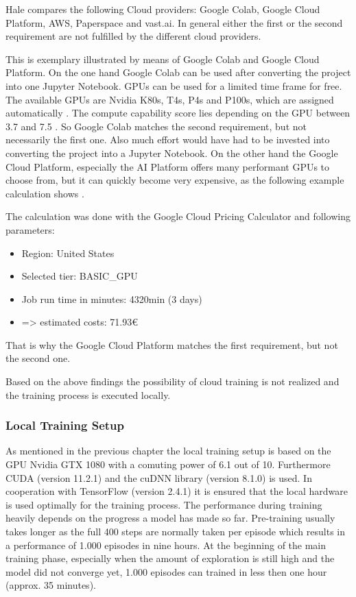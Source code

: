 Hale \cite{Hale2019} compares the following Cloud providers: Google Colab, Google Cloud Platform, AWS, Paperspace and vast.ai. In general either the first or the second requirement are not fulfilled by the different cloud providers. 

This is exemplary illustrated by means of Google Colab and Google Cloud Platform. 
On the one hand Google Colab can be used after converting the project into one Jupyter Notebook. GPUs can be used for a limited time frame for free. The available GPUs are Nvidia K80s, T4s, P4s and P100s, which are assigned automatically \cite{Colab2021}. The compute capability score lies depending on the GPU between 3.7 and 7.5 \cite{Nvidia}. So Google Colab matches the second requirement, but not necessarily the first one. Also much effort would have had to be invested into converting the project into a Jupyter Notebook. 
On the other hand the Google Cloud Platform, especially the AI Platform offers many performant GPUs to choose from, but it can quickly become very expensive, as the following example calculation shows \cite{GCP2021}. 

The calculation was done with the Google Cloud Pricing Calculator \cite{PreisRechner2021} and following parameters:
\begin{itemize}
	\item Region: United States
	\item Selected tier: BASIC\_GPU
	\item Job run time in minutes: 4320min (3 days)
	\item => estimated costs: 71.93€
\end{itemize}

That is why the Google Cloud Platform matches the first requirement, but not the second one.

Based on the above findings the possibility of cloud training is not realized and the training process is executed locally. 

\subsubsection{Local Training Setup}
\label{ch:approachBg}

As mentioned in the previous chapter the local training setup is based on the GPU Nvidia GTX 1080 with a comuting power of 6.1 out of 10. Furthermore CUDA (version 11.2.1) and the cuDNN library (version 8.1.0) is used. In cooperation with TensorFlow (version 2.4.1) it is ensured that the local hardware is used optimally for the training process. The performance during training heavily depends on the progress a model has made so far. Pre-training usually takes longer as the full 400 steps are normally taken per episode which results in a performance of 1.000 episodes in nine hours. At the beginning of the main training phase, especially when the amount of exploration is still high and the model did not converge yet, 1.000 episodes can trained in less then one hour (approx. 35 minutes).  

